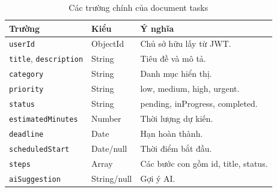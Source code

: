 \documentclass[12pt,a4paper,oneside]{report}
\begin{document}
\begin{table}[H]\centering\caption{Các trường chính của document tasks}
\begin{tabularx}{\textwidth}{p{3.1cm}p{3cm}X}\toprule\textbf{Trường}&\textbf{Kiểu}&\textbf{Ý nghĩa}\\\midrule
\texttt{userId}&ObjectId&Chủ sở hữu lấy từ JWT.\\
\texttt{title}, \texttt{description}&String&Tiêu đề và mô tả.\\
\texttt{category}&String&Danh mục hiển thị.\\
\texttt{priority}&String&low, medium, high, urgent.\\
\texttt{status}&String&pending, inProgress, completed.\\
\texttt{estimatedMinutes}&Number&Thời lượng dự kiến.\\
\texttt{deadline}&Date&Hạn hoàn thành.\\
\texttt{scheduledStart}&Date/null&Thời điểm bắt đầu.\\
\texttt{steps}&Array&Các bước con gồm id, title, status.\\
\texttt{aiSuggestion}&String/null&Gợi ý AI.\\\bottomrule
\end{tabularx}\end{table}
\end{document}
